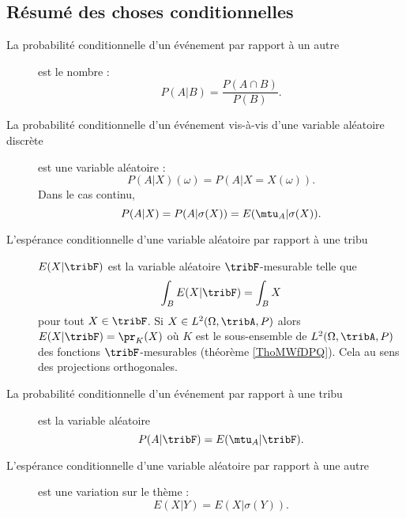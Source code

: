 \subsection{Résumé des choses conditionnelles}

\begin{description}

    \item[La probabilité conditionnelle d'un événement par rapport à un autre] est le nombre :
\begin{equation}
    P(A|B)=\frac{ P(A\cap B) }{ P(B) }.
\end{equation}

\item[La probabilité conditionnelle d'un événement vis-à-vis d'une variable aléatoire discrète] est une variable aléatoire :
\begin{equation}
    P(A|X)(\omega)=P(A|X=X(\omega)).
\end{equation}
Dans le cas continu,
\begin{equation}
    P(A|X)=P(A|\sigma(X))=E(\mtu_A|\sigma(X)).
\end{equation}

\item[L'espérance conditionnelle d'une variable aléatoire par rapport à une tribu] \( E(X|\tribF)\) est la variable aléatoire \( \tribF\)-mesurable telle que
\begin{equation}        \label{EQooFCBGooNxcQlL}
    \int_BE(X|\tribF)=\int_BX
\end{equation}
pour tout \( X\in \tribF\). Si \( X\in L^2(\Omega,\tribA,P)\) alors \( E(X|\tribF)=\pr_K(X)\) où \( K\) est le sous-ensemble de \( L^2(\Omega,\tribA,P)\) des fonctions \( \tribF\)-mesurables (théorème \ref{ThoMWfDPQ}). Cela au sens des projections orthogonales.

\item[La probabilité conditionnelle d'un événement par rapport à une tribu] est la variable aléatoire
\begin{equation}
    P(A|\tribF)=E(\mtu_A|\tribF).
\end{equation}

\item[L'espérance conditionnelle d'une variable aléatoire par rapport à une autre] est une variation sur le thème :
\begin{equation}
    E(X|Y)=E(X|\sigma(Y)).
\end{equation}

\end{description}

